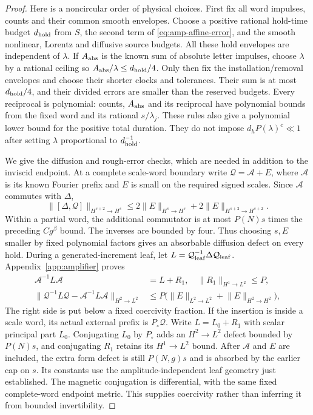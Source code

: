 \documentclass[11pt,a4paper]{amsart}
\theoremstyle{definition}
\theoremstyle{remark}
\numberwithin{equation}{section}
\newcommand{\norm}[1]{\lVert #1\rVert}
\begin{document}
\begin{proof}
Here is a noncircular order of physical choices.  First fix all word
impulses, counts and their common smooth envelopes.  Choose a positive
rational hold-time budget $d_{\rm hold}$ from $S$, the second term of
\eqref{eq:amp-affine-error}, and the smooth nonlinear, Lorentz and
diffusive source budgets.  All these hold envelopes are independent
of $\lambda$.  If $A_{\rm abs}$ is the known sum of absolute letter
impulses, choose $\lambda$ by a rational ceiling so
$A_{\rm abs}/\lambda\le d_{\rm hold}/4$.
Only then fix the installation/removal envelopes and choose their
shorter clocks and tolerances.  Their sum is at most $d_{\rm hold}/4$, and
their divided errors are smaller than the reserved budgets.
Every reciprocal is polynomial: counts, $A_{\rm abs}$ and its
reciprocal have polynomial bounds from the fixed word and its
rational $s/\lambda_j$.  These rules also give a polynomial lower
bound for the positive total duration.  They do not impose
$d_hP(\lambda)^c\ll1$ after setting $\lambda$ proportional to
$d_{\rm hold}^{-1}$.

We give the diffusion and rough-error checks, which are needed in
addition to the inviscid endpoint.  At a complete scale-word boundary
write $\mathcal Q=\mathcal A+E$, where $\mathcal A$ is its known
Fourier prefix and $E$ is small on the required signed scales.
Since $\mathcal A$ commutes with $\Delta$,
\[
 \norm{[\Delta,\mathcal Q]}_{H^{s+2}\to H^s}
      \le 2\norm E_{H^s\to H^s}+2\norm E_{H^{s+2}\to H^{s+2}} .
\]
Within a partial word, the additional commutator is at most
$P(N)s$ times the preceding $Cg^\beta$ bound.  The inverses are
bounded by four.  Thus choosing $s,E$ smaller by fixed polynomial
factors gives an absorbable diffusion defect on every hold.
During a generated-increment leaf, let
$L=\mathcal Q_{\rm leaf}^{-1}\Delta\mathcal Q_{\rm leaf}$.
Appendix~\ref{app:amplifier} proves
\begin{equation}\label{eq:amp-actual-form}
 \begin{split}
 \mathcal A^{-1}L\mathcal A&=L+R_1,\quad
       \norm{R_1}_{H^1\to L^2}\le P,\\
 \norm{\mathcal Q^{-1}L\mathcal Q-
                  \mathcal A^{-1}L\mathcal A}_{H^2\to L^2}
                    &\le P\bigl(\norm E_{L^2\to L^2}
                                  +\norm E_{H^2\to H^2}\bigr),
 \end{split}
\end{equation}
The right side is put below a fixed coercivity fraction.
If the insertion is inside a scale word, its actual external prefix is
$P_\circ\mathcal Q$. Write $L=L_0+R_1$ with scalar principal part $L_0$.
Conjugating $L_0$ by $P_\circ$ adds an $H^2\to L^2$ defect bounded by
$P(N)s$, and conjugating $R_1$ retains its $H^1\to L^2$ bound.
After $\mathcal A$ and $E$ are included, the extra form defect is still
$P(N,g)s$ and is absorbed by the earlier cap on $s$.
Its constants use the amplitude-independent leaf geometry just established.
The magnetic conjugation is differential, with the same fixed
complete-word endpoint metric.  This supplies coercivity rather
than inferring it from bounded invertibility.


\end{proof}
\end{document}
